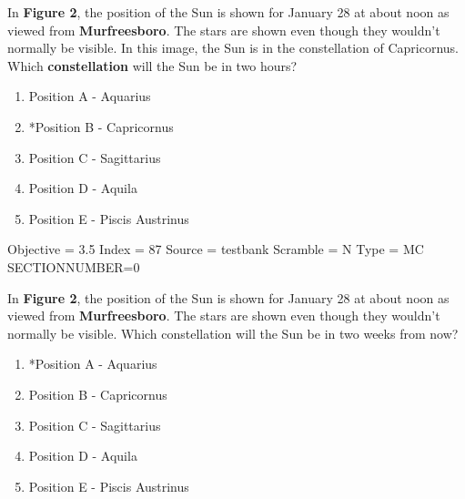 \documentclass[11pt]{article}
\begin{document}
\begin{enumerate}
\begin{minipage}{\textwidth}
\begin{minipage}{\textwidth}
\item In {\bf Figure 2}, the position of the Sun is shown for January 28 at about noon as viewed from {\bf Murfreesboro}.  The stars are shown even though they wouldn't normally be visible.   In this image, the Sun is in the constellation of Capricornus.  Which {\bf constellation} will the Sun be in two hours?
\begin{multicols}{2}
\begin{enumerate} 
\setlength{\itemsep}{1pt} 
\setlength{\parskip}{0pt} 
\setlength{\parsep}{0pt}
\setlength{\multicolsep}{1pt} 
\item Position A - Aquarius
\item *Position B - Capricornus
\item Position C - Sagittarius
\item Position D - Aquila
\item Position E - Piscis Austrinus
\end{enumerate} 
\vfill 
\end{multicols}

Objective = 3.5
Index = 87
Source = testbank
Scramble = N
Type = MC
SECTIONNUMBER=0
\end{minipage}
\end{minipage}
\vskip 0.20in

\begin{minipage}{\textwidth}
\begin{minipage}{\textwidth}
\item In {\bf Figure 2}, the position of the Sun is shown for January 28 at about noon as viewed from {\bf Murfreesboro}.  The stars are shown even though they wouldn't normally be visible.  Which constellation will the Sun be in two weeks from now?
\begin{multicols}{2}
\begin{enumerate} 
\setlength{\itemsep}{1pt} 
\setlength{\parskip}{0pt} 
\setlength{\parsep}{0pt}
\setlength{\multicolsep}{1pt} 
\item *Position A - Aquarius
\item Position B - Capricornus
\item Position C - Sagittarius
\item Position D - Aquila
\item Position E - Piscis Austrinus
\end{enumerate} 
\vfill 
\end{multicols}


\end{minipage}
\end{minipage}
\end{enumerate}
\end{document}
